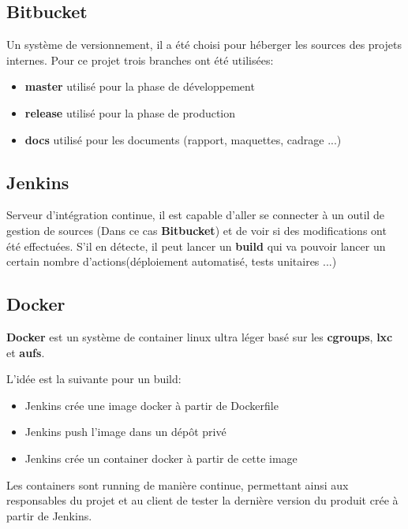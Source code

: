\documentclass [a4paper,11pt]{article}
\begin{document}
\subsection{Bitbucket}

Un système de versionnement, il a été choisi pour héberger les sources des projets internes.\cite{BITBUCKET} Pour ce projet trois branches ont été utilisées:\newline

\begin{itemize}
 \item \textbf{master} utilisé pour la phase de développement
 \item \textbf{release} utilisé pour la phase de production
 \item \textbf{docs} utilisé pour les documents (rapport, maquettes, cadrage ...)
\end{itemize}

\subsection{Jenkins}

Serveur d'intégration continue, il est capable d’aller se connecter à un outil de gestion de sources (Dans ce cas \textbf{Bitbucket}) et de voir si des modifications ont été effectuées. S’il en détecte, il peut lancer un \textbf{build} qui va pouvoir lancer un certain nombre d’actions(déploiement automatisé, tests unitaires ...)

\subsection{Docker}

\textbf{Docker} est un système de container linux ultra léger basé sur les \textbf{cgroups}, \textbf{lxc} et \textbf{aufs}.\newline

L'idée est la suivante pour un build:\newline

\begin{itemize}
 \item Jenkins crée une image docker à partir de Dockerfile
 \item Jenkins push l'image dans un dépôt privé
 \item Jenkins crée un container docker à partir de cette image\newline
\end{itemize}

Les containers sont running de manière continue, permettant ainsi aux responsables du projet et au client de tester la dernière version du produit crée à partir de Jenkins.
\end{document}
